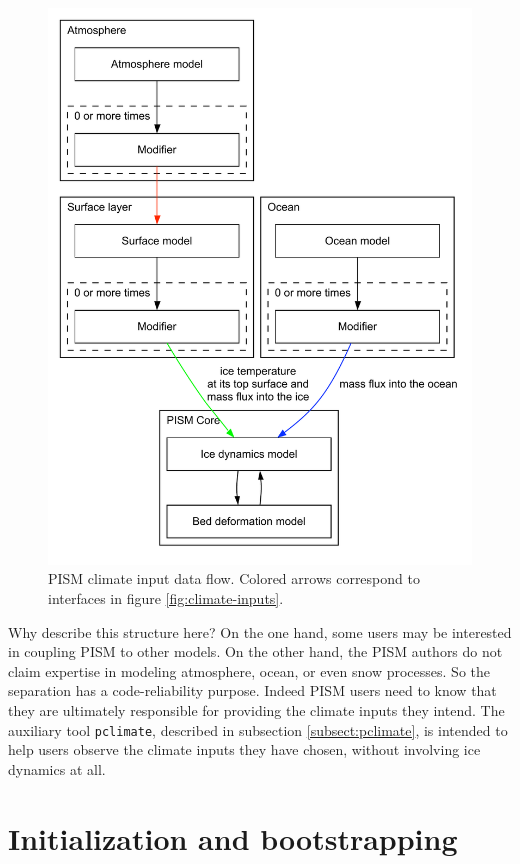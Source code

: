 \documentclass[titlepage,letterpaper,final]{scrartcl}
\begin{document}
\begin{figure}
  \centering
  \includegraphics[width=5in]{figs/data-flow.pdf}
  \caption{PISM climate input data flow. Colored arrows correspond to interfaces in
    figure \ref{fig:climate-inputs}.}
  \label{fig:climate-input-data-flow}
\end{figure}

Why describe this structure here? On the one hand, some users may be interested
in coupling PISM to other models. On the other hand, the PISM authors do not
claim expertise in modeling atmosphere, ocean, or even snow processes.   So the
separation has a code-reliability purpose. Indeed PISM users need to know that
they are ultimately responsible for providing the climate inputs they intend.
The auxiliary tool \texttt{pclimate}, described in subsection
\ref{subsect:pclimate}, is intended to help users observe the climate inputs
they have chosen, without involving ice dynamics at all.

\clearpage
\newpage
\section{Initialization and bootstrapping}
\label{sect:boot}  
\end{document}
